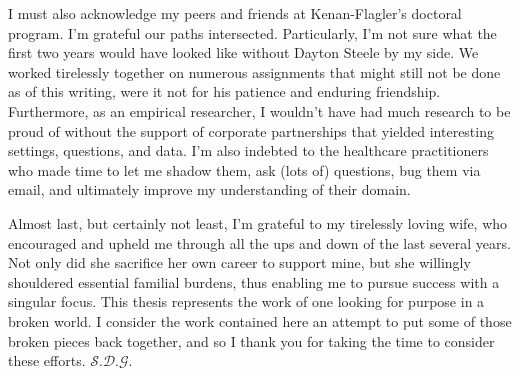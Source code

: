 I must also acknowledge my peers and friends at Kenan-Flagler’s doctoral program. I’m grateful our paths intersected. Particularly, I’m not sure what the first two years would have looked like without Dayton Steele by my side. We worked tirelessly together on numerous assignments that might still not be done as of this writing, were it not for his patience and enduring friendship. Furthermore, as an empirical researcher, I wouldn’t have had much research to be proud of without the support of corporate partnerships that yielded interesting settings, questions, and data. I’m also indebted to the healthcare practitioners who made time to let me shadow them, ask (lots of) questions, bug them via email, and ultimately improve my understanding of their domain.

Almost last, but certainly not least, I’m grateful to my tirelessly loving wife, who encouraged and upheld me through all the ups and down of the last several years. Not only did she sacrifice her own career to support mine, but she willingly shouldered essential familial burdens, thus enabling me to pursue success with a singular focus.
This thesis represents the work of one looking for purpose in a broken world. I consider the work contained here an attempt to put some of those broken pieces back together, and so I thank you for taking the time to consider these efforts. $\mathcal{S.D.G.}$


\clearpage
